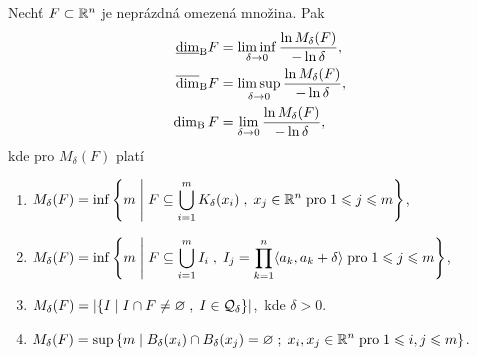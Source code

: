 \begin{theorem}\label{thm:ekvivalentni-def-box-counting-dimenze}
    Nechť $F\subset \mathbb{R}^n$ je neprázdná omezená množina. Pak
    \begin{align*}
        \underline{\dim}_\textup{B}{F}&=\liminf_{\delta\to 0}\dfrac{\ln{M_\delta(F)}}{-\ln{\delta}},\\
        \overline{\dim}_\textup{B}{F}&=\limsup_{\delta\to 0}\dfrac{\ln{M_\delta(F)}}{-\ln{\delta}},\\
        \operatorname{dim_B}{F}&=\lim_{\delta\to 0}\dfrac{\ln{M_\delta(F)}}{-\ln{\delta}},
    \end{align*}
    kde pro $M_\delta(F)$ platí
    \begin{enumerate}[label=(\roman*)]
        \item\label{thm:pokryti-delta-uz-koulemi} $\displaystyle M_\delta(F)=\inf\left\{m\;\middle|\;F\subseteq\bigcup\limits_{i=1}^m K_\delta(x_i)\;,\;x_j\in\mathbb{R}^n\;\text{pro}\;1\leqslant j\leqslant m\right\}$,
        \item\label{thm:pokryti-delta-kvadry} $\displaystyle M_\delta(F)=\inf\left\{m\;\middle|\;F\subseteq\bigcup\limits_{i=1}^m I_i\;,\;I_j=\prod_{k=1}^{n}\langle a_k,a_k+\delta\rangle\;\text{pro}\;1\leqslant j\leqslant m\right\}$,
        \item\label{thm:pokryti-delta-sit} $\displaystyle M_\delta(F)=\left|\left\{I\;\middle|\;I\cap F\neq\varnothing\;,\;I\in\mathcal{Q}_\delta\right\}\right|$,~kde $\delta>0$.
        \item\label{thm:pokryti-delta-dis-ot-koulemi} $\displaystyle M_\delta(F)=\sup\left\{m\;\middle|\;B_\delta(x_i)\cap B_\delta(x_j)=\varnothing\;;\;x_i,x_j\in\mathbb{R}^n\;\text{pro}\;1\leqslant i,j\leqslant m\right\}$.
    \end{enumerate}
\end{theorem}

